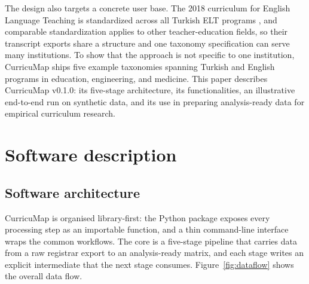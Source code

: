 \documentclass[11pt]{article}
\begin{document}
The design also targets a concrete user base. The 2018 curriculum for English Language Teaching is standardized across all Turkish ELT programs \cite{yok2018}, and comparable standardization applies to other teacher-education fields, so their transcript exports share a structure and one taxonomy specification can serve many institutions. To show that the approach is not specific to one institution, CurricuMap ships five example taxonomies spanning Turkish and English programs in education, engineering, and medicine. This paper describes CurricuMap v0.1.0: its five-stage architecture, its functionalities, an illustrative end-to-end run on synthetic data, and its use in preparing analysis-ready data for empirical curriculum research.

\section{Software description}

\subsection{Software architecture}

CurricuMap is organised library-first: the Python package exposes every processing step as an importable function, and a thin command-line interface wraps the common workflows. The core is a five-stage pipeline that carries data from a raw registrar export to an analysis-ready matrix, and each stage writes an explicit intermediate that the next stage consumes. Figure~\ref{fig:dataflow} shows the overall data flow.
\end{document}
